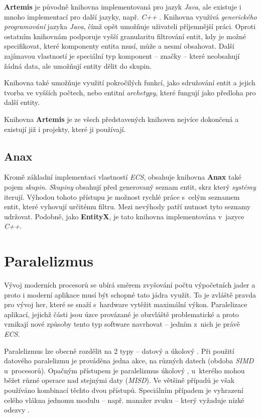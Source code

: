 \textbf{Artemis} \cite{ArtemisJava} je původně knihovna implementovaná pro jazyk \emph{Java}, ale existuje i mnoho implementací pro další jazyky, např. \emph{C++} \cite{ArtemisCpp}. Knihovna využívá \emph{generického programování} jazyka \emph{Java}, čímž opět umožňuje uživateli příjemnější práci. Oproti ostatním knihovnám podporuje vyšší granularitu filtrování entit, kdy je možné specifikovat, které komponenty entita musí, může a nesmí obsahovat. Další zajímavou vlastností je speciální typ komponent -- značky -- které neobsahují žádná data, ale umožňují entity dělit do skupin. 

Knihovna také umožňuje využití pokročilých funkcí, jako sdružování entit a jejich tvorba ve vyšších počtech, nebo entitní \emph{archetypy}, které fungují jako předloha pro další entity.

Knihovna \textbf{Artemis} je ze všech představených knihoven nejvíce dokončená a existují již i projekty, které ji používají.

\subsection{Anax}

Kromě základní implementaci vlastností \emph{ECS}, obsahuje knihovna \textbf{Anax} \cite{Anax} také pojem \emph{skupin}. \emph{Skupiny} obsahují před generovaný seznam entit, skrz který \emph{systémy} iterují. Výhodou tohoto přístupu je možnost rychlé práce s~celým seznamem entit, které vyhovují určitému filtru. Mezi nevýhody patří nutnost tyto seznamy udržovat. Podobně, jako \textbf{EntityX}, je tato knihovna implementována v~jazyce \emph{C++}. 

\section{Paralelizmus}
\label{Chap:Parallelism}

Vývoj moderních procesorů se ubírá směrem zvyšování počtu výpočetních jader \cite{CPUPerfHistory} a proto i moderní aplikace musí být schopné tato jádra využít. To je zvláště pravda pro vývoj her, které se snaží s~hardware vytěžit maximální výkon. Paralelizace aplikací, jejichž části jsou úzce provázané je obzvláště problematické a proto vznikají nové způsoby tento typ software navrhovat -- jedním z~nich je právě \emph{ECS}. 

Paralelizmus lze obecně rozdělit na 2 typy -- datový a úkolový \cite{KindsOfParallelism}. Při použití datového paralelizmu je prováděna jedna akce, na různých datech (obdoba \emph{SIMD} u~procesorů). Opačným přístupem je paralelizmus úkolový \cite{TaskBasedParallelism}, u~kterého mohou běžet různé operace nad stejnými daty (\emph{MISD}). Ve většině případů je však používáno kombinací těchto dvou přístupů. Speciálním případem je vyhrazení celého vlákna jednomu modulu -- např. manažer zvuku -- který vyžaduje nízké odezvy \cite{FrontierThreads}.

